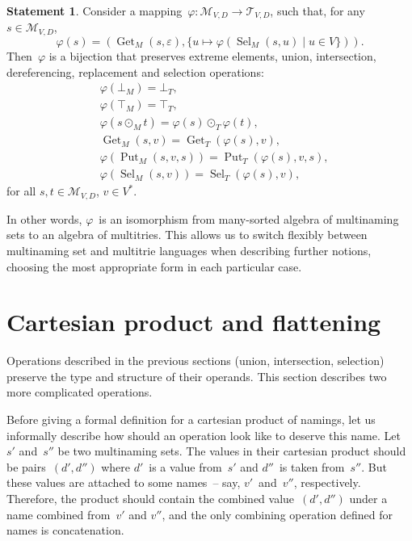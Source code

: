 \documentclass{article}
\theoremstyle{definition}
\newtheorem{St}{Statement}
\newcommand{\setcharmvcn}{M}
\newcommand{\setcharmt}{T}
\newcommand{\setsymbol}[3]{\mathcal{#1}_{#2,#3}}
\newcommand{\setmvcn}[2]{\setsymbol{\setcharmvcn}{#1}{#2}}
\newcommand{\setmt}[2]{\setsymbol{\setcharmt}{#1}{#2}}
\newcommand{\select}{\operatorname{Sel}}
\newcommand{\deref}{\operatorname{Get}}
\newcommand{\putval}{\operatorname{Put}}
\begin{document}
\begin{St}\label{st:isomorph}
Consider a mapping~$\varphi: \setmvcn{V}{D} \to \setmt{V}{D}$, such that,
for any~$s\in \setmvcn{V}{D}$,
\[
  \varphi(s) = (
    \deref_\setcharmvcn(s, \varepsilon) ,
    \{ u \mapsto \varphi(\select_\setcharmvcn(s, u) \mid u\in V \})
  ) .
\]
Then~$\varphi$ is a bijection that preserves
extreme elements, union, intersection, dereferencing, replacement and selection
operations:
\begin{eqnarray*}
  & \varphi(\bot_{\setcharmvcn}) = \bot_{\setcharmt}, \\
  & \varphi(\top_{\setcharmvcn}) = \top_{\setcharmt}, \\
  & \varphi(s \mathbin{\odot_{\setcharmvcn}} t) =
      \varphi(s) \mathbin{\odot_{\setcharmt}} \varphi(t) , \\
  & \deref_{\setcharmvcn}(s, v) =
      \deref_{\setcharmt}(\varphi(s), v) , \\
  & \varphi(\putval_{\setcharmvcn}(s, v, s)) =
      \putval_{\setcharmt}(\varphi(s), v, s) , \\
  & \varphi(\select_{\setcharmvcn}(s, v)) =
      \select_{\setcharmt}(\varphi(s), v) ,
\end{eqnarray*}
for all $s,t \in \setmvcn{V}{D}$, $v \in V^\ast$.
\end{St}

In other words, $\varphi$~is an isomorphism from many-sorted algebra of
multinaming sets to an algebra of multitries.
This allows us to switch flexibly between multinaming set and multitrie
languages when describing further notions, choosing the most
appropriate form in each particular case.



\section{Cartesian product and flattening}

Operations described in the previous sections (union, intersection, selection)
preserve the type and structure of their operands. This section describes two
more complicated operations.

Before giving a formal definition for a cartesian product of namings, let us
informally describe how should an operation look like to deserve this name.
Let~$s'$ and~$s''$ be two multinaming sets. The values in their cartesian
product should be pairs~$(d',d'')$ where $d'$~is a value from~$s'$ and $d''$~is
taken from~$s''$. But these values are attached to some names~-- say,
$v'$~and~$v''$, respectively.  Therefore, the product should contain the
combined value~$(d',d'')$ under a name combined from~$v'$ and $v''$, and the
only combining operation defined for names is concatenation.
\end{document}
